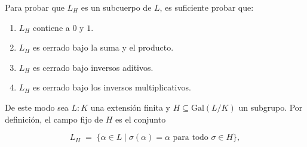 \begin{solucion}
\newcommand{\Gal}{\mathrm{Gal}}
Para probar que $L_H$ es un subcuerpo de $L$, es suficiente probar que:
\begin{enumerate}
    \item $L_H$ contiene a $0$ y $1$.
    \item $L_H$ es cerrado bajo la suma y el producto.
    \item $L_H$ es cerrado bajo inversos aditivos.
    \item $L_H$ es cerrado bajo los inversos multiplicativos.
\end{enumerate}

De este modo sea $L:K$ una extensión finita y $H\subseteq \Gal(L/K)$ un subgrupo. Por definición, el campo fijo de $H$ es el conjunto 

\[L_H \;=\; \{\alpha\in L \mid \sigma(\alpha)=\alpha \text{ para todo }\sigma\in H\},\] 


\end{solucion}
